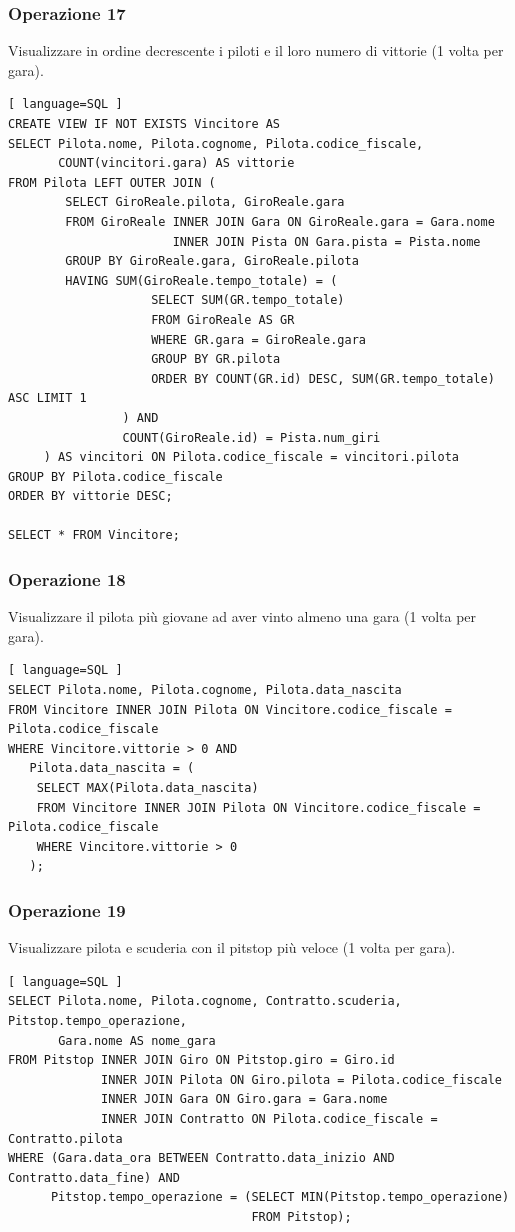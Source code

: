 \documentclass[11pt]{article}
\begin{document}
\subsubsection{Operazione 17}
Visualizzare in ordine decrescente i piloti e il loro numero di vittorie (1 volta per gara).
\begin{lstlisting}[ language=SQL ]
CREATE VIEW IF NOT EXISTS Vincitore AS
SELECT Pilota.nome, Pilota.cognome, Pilota.codice_fiscale, 
       COUNT(vincitori.gara) AS vittorie
FROM Pilota LEFT OUTER JOIN (
        SELECT GiroReale.pilota, GiroReale.gara
        FROM GiroReale INNER JOIN Gara ON GiroReale.gara = Gara.nome
                       INNER JOIN Pista ON Gara.pista = Pista.nome
        GROUP BY GiroReale.gara, GiroReale.pilota
        HAVING SUM(GiroReale.tempo_totale) = (
                    SELECT SUM(GR.tempo_totale)
                    FROM GiroReale AS GR
                    WHERE GR.gara = GiroReale.gara
                    GROUP BY GR.pilota
                    ORDER BY COUNT(GR.id) DESC, SUM(GR.tempo_totale) ASC LIMIT 1
                ) AND
                COUNT(GiroReale.id) = Pista.num_giri
     ) AS vincitori ON Pilota.codice_fiscale = vincitori.pilota
GROUP BY Pilota.codice_fiscale
ORDER BY vittorie DESC;

SELECT * FROM Vincitore;
\end{lstlisting}


\subsubsection{Operazione 18}
Visualizzare il pilota più giovane ad aver vinto almeno una gara (1 volta per gara).
\begin{lstlisting}[ language=SQL ]
SELECT Pilota.nome, Pilota.cognome, Pilota.data_nascita
FROM Vincitore INNER JOIN Pilota ON Vincitore.codice_fiscale = Pilota.codice_fiscale
WHERE Vincitore.vittorie > 0 AND
   Pilota.data_nascita = (
    SELECT MAX(Pilota.data_nascita)
    FROM Vincitore INNER JOIN Pilota ON Vincitore.codice_fiscale = Pilota.codice_fiscale
    WHERE Vincitore.vittorie > 0
   );
\end{lstlisting}


\subsubsection{Operazione 19}
Visualizzare pilota e scuderia con il pitstop più veloce (1 volta per gara).
\begin{lstlisting}[ language=SQL ]
SELECT Pilota.nome, Pilota.cognome, Contratto.scuderia, Pitstop.tempo_operazione, 
       Gara.nome AS nome_gara
FROM Pitstop INNER JOIN Giro ON Pitstop.giro = Giro.id
             INNER JOIN Pilota ON Giro.pilota = Pilota.codice_fiscale
             INNER JOIN Gara ON Giro.gara = Gara.nome
             INNER JOIN Contratto ON Pilota.codice_fiscale = Contratto.pilota
WHERE (Gara.data_ora BETWEEN Contratto.data_inizio AND Contratto.data_fine) AND
      Pitstop.tempo_operazione = (SELECT MIN(Pitstop.tempo_operazione)
                                  FROM Pitstop);
\end{lstlisting}
\end{document}
